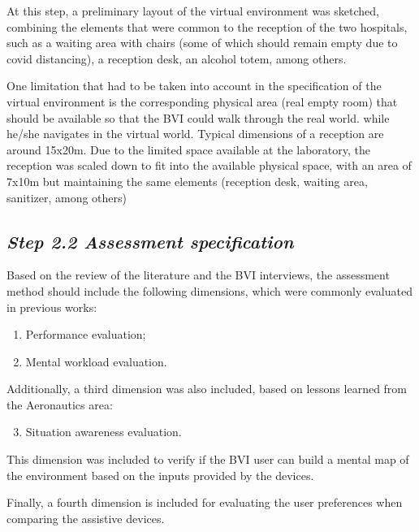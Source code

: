         At this step, a preliminary layout of the virtual environment was sketched, combining the elements that were common to the reception of the two hospitals, such as a waiting area with chairs (some of which should remain empty due to covid distancing), a reception desk, an alcohol totem, among others.

        One limitation that had to be taken into account in the specification of the virtual environment is the corresponding physical area (real empty room) that should be available so that the BVI could walk through the real world. while he/she navigates in the virtual world. Typical dimensions of a reception are around 15x20m. Due to the limited space available at the laboratory, the reception was scaled down to fit into the available physical space, with an area of 7x10m but maintaining the same elements (reception desk, waiting area, sanitizer, among others)
    

    \subsection*{\textit{Step 2.2 Assessment specification}}
        Based on the review of the literature and the BVI interviews, the assessment method should include the following dimensions, which were commonly evaluated in previous works: 

        \begin{enumerate} [label = \Alph*)]
            \item Performance evaluation;
            \item Mental workload evaluation.
        \end{enumerate}
            
        Additionally, a third dimension was also included, based on lessons learned from the Aeronautics area:   

        \begin{enumerate} [label = \Alph*)]
            \setcounter{enumi}{2}
            \item Situation awareness evaluation.
        \end{enumerate}
            
        This dimension was included to verify if the BVI user can build a mental map of the environment based on the inputs provided by the devices.

        Finally, a fourth dimension is included for evaluating the user preferences when comparing the assistive devices.

